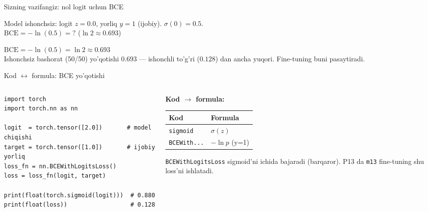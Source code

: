 \documentclass[aspectratio=169,11pt]{beamer}
\begin{document}
\begin{frame}{Sizning vazifangiz: nol logit uchun BCE}
  \begin{tcolorbox}[warnbox,title=Savol --- 60 soniya]
    \small
    Model ishonchsiz: logit $z=0.0$, yorliq $y=1$ (ijobiy). $\sigma(0)=0.5$.\\[4pt]
    \textbf{\large $\mathrm{BCE} = -\ln(0.5) = ?$} \quad
    \footnotesize ($\ln 2 \approx 0.693$)
  \end{tcolorbox}
  \pause
  \begin{tcolorbox}[okbox,title=Javob]
    \small
    $\mathrm{BCE} = -\ln(0.5) = \ln 2 \approx \mathbf{0.693}$\\[3pt]
    \footnotesize Ishonchsiz bashorat (50/50) yo'qotishi $0.693$ --- ishonchli
    to'g'ri ($0.128$) dan ancha yuqori. Fine-tuning buni pasaytiradi.
  \end{tcolorbox}
\end{frame}

\begin{frame}[fragile]{Kod $\leftrightarrow$ formula: BCE yo'qotishi}
  \begin{columns}[T]
    \begin{column}{0.58\textwidth}
\begin{lstlisting}
import torch
import torch.nn as nn

logit  = torch.tensor([2.0])       # model chiqishi
target = torch.tensor([1.0])       # ijobiy yorliq
loss_fn = nn.BCEWithLogitsLoss()
loss = loss_fn(logit, target)

print(float(torch.sigmoid(logit)))  # 0.880
print(float(loss))                  # 0.128
\end{lstlisting}
    \end{column}
    \begin{column}{0.38\textwidth}
      \textbf{Kod $\to$ formula:}\\[3pt]
      \footnotesize
      \begin{tabular}{p{1.9cm}p{1.9cm}}
        \toprule
        Kod & Formula \\
        \midrule
        \texttt{sigmoid} & $\sigma(z)$ \\
        \texttt{BCEWith...} & $-\ln p$ (y=1) \\
        \bottomrule
      \end{tabular}
      \vspace{4pt}
      \begin{tcolorbox}[okbox,top=2pt,bottom=2pt]
        \footnotesize
        \texttt{BCEWithLogitsLoss} sigmoid'ni ichida bajaradi (barqaror).
        P13 da \texttt{m13} fine-tuning shu loss'ni ishlatadi.
      \end{tcolorbox}
    \end{column}
  \end{columns}
\end{frame}
\end{document}
